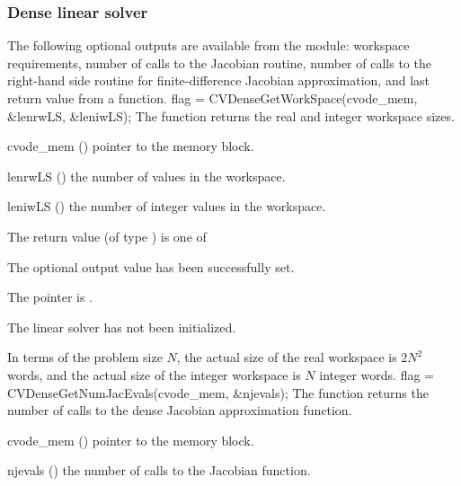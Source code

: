 \subsubsection{Dense linear solver}\label{sss:optout_dense}
The following optional outputs are available from the {\cvdense} module:
workspace requirements, number of calls to the Jacobian routine, number of 
calls to the right-hand side routine for finite-difference Jacobian approximation,
and last return value from a {\cvdense} function.
{
  flag = CVDenseGetWorkSpace(cvode\_mem, \&lenrwLS, \&leniwLS);
}
{
  The function  returns the
  {\cvdense} real and integer workspace sizes.
}
{
  \begin{args}
  \item[cvode\_mem] ()
    pointer to the {\cvode} memory block.
  \item[lenrwLS] ()
    the number of  values in the {\cvdense} workspace.
  \item[leniwLS] ()
    the number of integer values in the {\cvdense} workspace.
  \end{args}
}
{
  The return value  (of type ) is one of
  \begin{args}
  \item[\Id{CVDENSE\_SUCCESS}] 
    The optional output value has been successfully set.
  \item[\Id{CVDENSE\_MEM\_NULL}]
    The  pointer is .
  \item[\Id{CVDENSE\_LMEM\_NULL}]
    The {\cvdense} linear solver has not been initialized.
  \end{args}
}
{
  In terms of the problem size $N$, the actual size of the real workspace
  is $2N^2$  words, and the actual size of the integer workspace
  is $N$ integer words.
}
{
  flag = CVDenseGetNumJacEvals(cvode\_mem, \&njevals);
}
{
  The function  returns the
  number of calls to the dense Jacobian approximation function.
}
{
  \begin{args}
  \item[cvode\_mem] ()
    pointer to the {\cvode} memory block.
  \item[njevals] ()
    the number of calls to the Jacobian function.
  \end{args}
}
